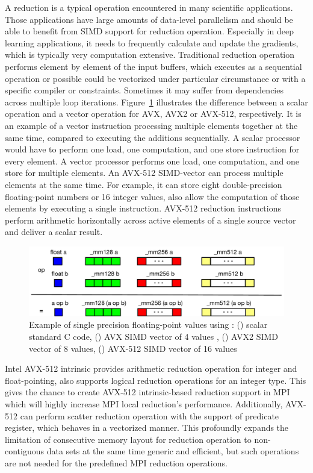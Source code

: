 \documentclass[5p,times,twocolumn]{elsarticle}
\newcommand{\mpi}[0]{\textsc{MPI}\xspace}
\begin{document}
A reduction is a typical operation encountered in many scientific applications.
Those applications have large amounts of data-level parallelism and should be able
to benefit from SIMD support for reduction operation. Especially in deep learning applications,
it needs to frequently calculate and update the gradients, which is typically very computation extensive.
Traditional reduction operation performs element by element of the input buffers,
which executes as a sequential operation or possible could be vectorized
under particular circumstance or with a specific compiler or constraints. Sometimes
it may suffer from dependencies across multiple loop iterations.
%
Figure~\ref{fig:sseavx} illustrates the difference between a scalar operation and
a vector operation for AVX, AVX2 or AVX-512, respectively.
%
It is an example of a vector instruction processing multiple elements together at the same time,
compared to executing the additions sequentially. A scalar processor would have to perform one load,
one computation, and one store instruction for every element. A vector processor performs one load,
one computation, and one store for multiple elements.
An AVX-512 SIMD-vector can process multiple elements at
the same time. For example, it can store eight double-precision floating-point numbers or 16 integer values, also allow the computation of those elements by executing a single instruction.
AVX-512 reduction instructions perform arithmetic horizontally across active elements of a
single source vector and deliver a scalar result.

\begin{figure}[h]
    \centering
    \includegraphics[width=\linewidth]{sse_avx.pdf}
    \caption{Example of single precision floating-point values using : (\colorbox{blue}{}) scalar standard C code, (\colorbox{green}{}) AVX SIMD vector of 4 values , (\colorbox{red}{}) AVX2 SIMD vector of 8 values, (\colorbox{yellow}{}) AVX-512 SIMD vector of 16 values}
    \label{fig:sseavx}
\end{figure}

Intel AVX-512 intrinsic provides arithmetic reduction operation for integer and
float-pointing, also supports logical reduction operations for an integer type.
This gives the chance to create AVX-512 intrinsic-based reduction support in \mpi which
will highly increase \mpi local reduction's performance.
Additionally, AVX-512 can perform scatter reduction operation with the
support of predicate register, which behaves in a vectorized manner. This profoundly
expands the limitation of consecutive memory layout for reduction operation to non-contiguous
data sets at the same time generic and efficient, but such operations
are not needed for the predefined MPI reduction operations.
\end{document}
